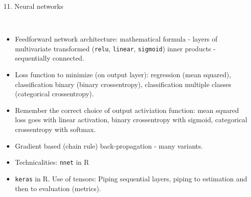 \documentclass[10pt,ignorenonframetext,]{beamer}
\begin{document}
\begin{frame}[fragile]

\begin{block}{11. Neural networks}

\(~\)

\begin{itemize}
\item
  Feedforward network architecture: mathematical formula - layers of
  multivariate transformed (\texttt{relu}, \texttt{linear},
  \texttt{sigmoid}) inner products - sequentially connected.
  \vspace{2mm}
\item
  Loss function to minimize (on output layer): regression (mean
  squared), classification binary (binary crossentropy), classification
  multiple classes (categorical crossentropy). \vspace{2mm}
\item
  Remember the correct choice of output activiation function: mean
  squared loss goes with linear activation, binary crossentropy with
  sigmoid, categorical crossentropy with softmax. \vspace{2mm}
\item
  Gradient based (chain rule) back-propagation - many variants.
  \vspace{2mm}
\item
  Technicalities: \texttt{nnet} in R \vspace{2mm}
\item
  \texttt{keras} in R. Use of tensors: Piping sequential layers, piping
  to estimation and then to evaluation (metrics).
\end{itemize}

\end{block}

\end{frame}
\end{document}
